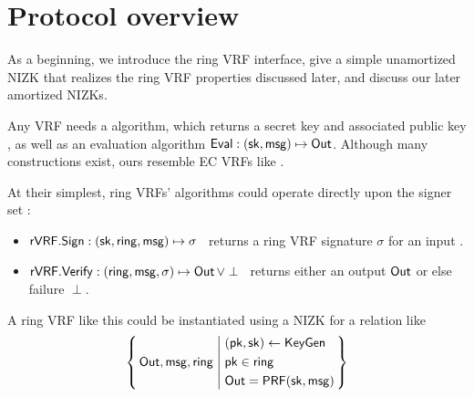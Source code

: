 \section{Protocol overview}
\label{sec:overview}

As a beginning, we introduce the ring VRF interface, give a simple
unamortized NIZK that realizes the ring VRF properties discussed later,
and discuss our later amortized NIZKs.

Any VRF needs a \KeyGen algorithm, which returns a secret key \sk and
associated public key \pk, as well as an evaluation algorithm
${\mathsf{Eval}} : (\mathsf{sk},\mathsf{msg}) \mapsto {\ensuremath{\mathsf{Out}}}$. %
%
Although many constructions exist,
 ours resemble EC VRFs like \cite{nsec5,VXEd25519,draft-irtf-cfrg-vrf-10}.

At their simplest, ring VRFs' algorithms could operate directly
upon the signer set \ring:
\begin{itemize}
\item ${\mathsf{rVRF}}.{\mathsf{Sign}} : (\mathsf{sk},\mathsf{ring},\mathsf{msg}) \mapsto \sigma$ \,
    returns a ring VRF signature $\sigma$ for an input \msg.
\item ${\mathsf{rVRF}}.{\mathsf{Verify}} : (\mathsf{ring},\mathsf{msg},\sigma) \mapsto {\ensuremath{\mathsf{Out}}} \, \lor \perp$ \,
    returns either an output ${\mathsf{Out}}$ or else failure $\perp$.
\end{itemize}

A ring VRF like this could be instantiated using a NIZK for a relation like
$$ \Setst{ \Out, \msg, \ring }{
    \eprint{
        (\pk,\sk) \leftarrow \KeyGen, \quad %
        \pk \in \ring, \quad
        \Out = \PRF(\sk,\msg)
    }{
        \begin{aligned}
        & (\pk,\sk) \leftarrow \KeyGen \\
        & \pk \in \ring \\
        & \Out = \PRF(\sk,\msg)
        \end{aligned}
    }
} $$

